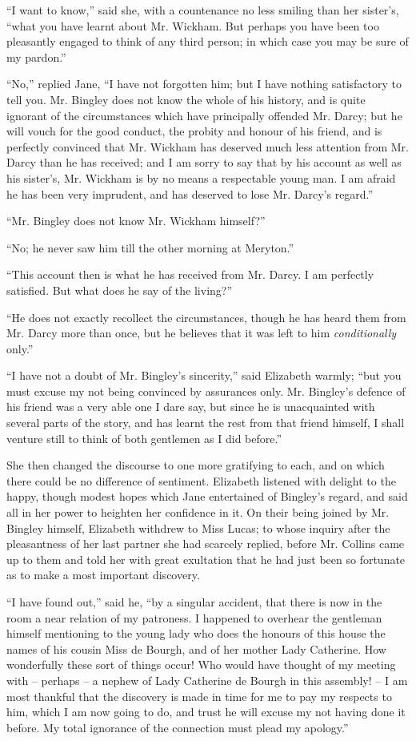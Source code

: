 “I want to know,” said she, with a countenance no
less smiling than her sister’s, “what you have learnt
about Mr. Wickham. But perhaps you have been too
pleasantly engaged to think of any third person; in which
case you may be sure of my pardon.”

“No,” replied Jane, “I have not forgotten him; but
I have nothing satisfactory to tell you. Mr. Bingley does
not know the whole of his history, and is quite ignorant
of the circumstances which have principally offended
Mr. Darcy; but he will vouch for the good conduct, the
probity and honour of his friend, and is perfectly convinced
that Mr. Wickham has deserved much less attention from
Mr. Darcy than he has received; and I am sorry to say
that by his account as well as his sister’s, Mr. Wickham
is by no means a respectable young man. I am afraid
he has been very imprudent, and has deserved to lose
Mr. Darcy’s regard.”

“Mr. Bingley does not know Mr. Wickham himself?”

“No; he never saw him till the other morning at
Meryton.”

“This account then is what he has received from
Mr. Darcy. I am perfectly satisfied. But what does he
say of the living?”

“He does not exactly recollect the circumstances,
though he has heard them from Mr. Darcy more than
once, but he believes that it was left to him \textit{conditionally}
only.”

“I have not a doubt of Mr. Bingley’s sincerity,” said
Elizabeth warmly; “but you must excuse my not being
convinced by assurances only. Mr. Bingley’s defence of
his friend was a very able one I dare say, but since he
is unacquainted with several parts of the story, and has
learnt the rest from that friend himself, I shall venture
still to think of both gentlemen as I did before.”

She then changed the discourse to one more gratifying
to each, and on which there could be no difference of
sentiment. Elizabeth listened with delight to the happy,
though modest hopes which Jane entertained of Bingley’s
regard, and said all in her power to heighten her confidence
in it. On their being joined by Mr. Bingley
himself, Elizabeth withdrew to Miss Lucas; to whose
inquiry after the pleasantness of her last partner she had
scarcely replied, before Mr. Collins came up to them and
told her with great exultation that he had just been so
fortunate as to make a most important discovery.

“I have found out,” said he, “by a singular accident,
that there is now in the room a near relation of my
patroness. I happened to overhear the gentleman himself
mentioning to the young lady who does the honours of
this house the names of his cousin Miss de Bourgh, and of
her mother Lady Catherine. How wonderfully these sort
of things occur! Who would have thought of my meeting
with -- perhaps -- a nephew of Lady Catherine de Bourgh
in this assembly! -- I am most thankful that the discovery
is made in time for me to pay my respects to him, which
I am now going to do, and trust he will excuse my not
having done it before. My total ignorance of the connection
must plead my apology.”


